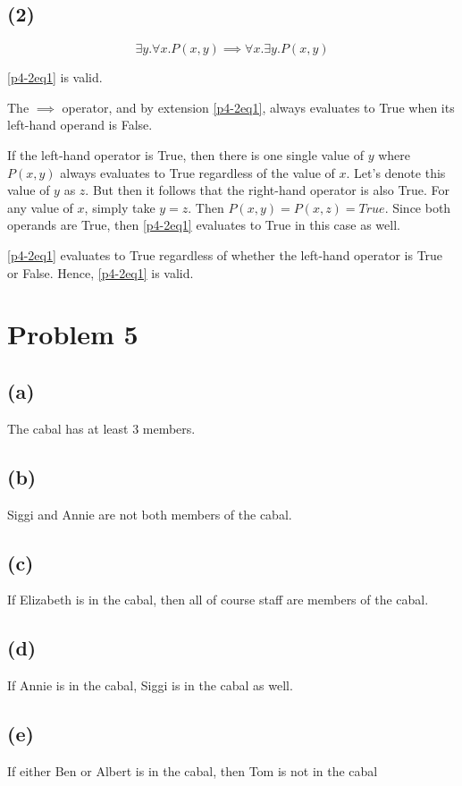 \documentclass{article}
\begin{document}
\subsection{(2)}
\begin{equation}\label{p4-2eq1}
	\exists y. \forall x.P(x, y) \implies \forall x. \exists y.P(x, y)
\end{equation}

\eqref{p4-2eq1} is valid.

The $\implies$ operator, and by extension \eqref{p4-2eq1}, always evaluates to True when its left-hand operand is False.

If the left-hand operator is True, then there is one single value of $y$ where $P(x, y)$ always evaluates to True regardless of the value of $x$. Let's denote this value of $y$ as $z$. But then it follows that the right-hand operator is also True. For any value of $x$, simply take $y = z$. Then $P(x, y) = P(x, z) = True$. Since both operands are True, then \eqref{p4-2eq1} evaluates to True in this case as well.

\eqref{p4-2eq1} evaluates to True regardless of whether the left-hand operator is True or False. Hence, \eqref{p4-2eq1} is valid.

\pagebreak

\section{Problem 5}
\subsection{(a)}
The cabal has at least 3 members.
\subsection{(b)}
Siggi and Annie are not both members of the cabal.
\subsection{(c)}
If Elizabeth is in the cabal, then all of course staff are members of the cabal.
\subsection{(d)}
If Annie is in the cabal, Siggi is in the cabal as well.
\subsection{(e)}
If either Ben or Albert is in the cabal, then Tom is not in the cabal
\end{document}
